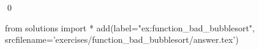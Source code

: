 
\begin{ex}
  \label{ex:function_bad_bubblesort}
  
  \mbox{}\\ \\
  \qed
\end{ex}
\begin{python0}
from solutions import *
add(label="ex:function_bad_bubblesort",
    srcfilename='exercises/function_bad_bubblesort/answer.tex') 
\end{python0}                              
